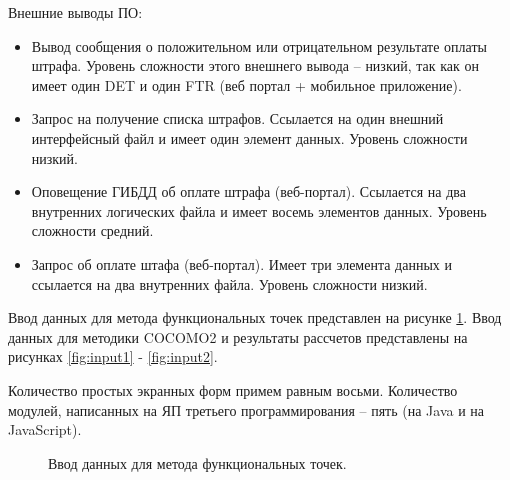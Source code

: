 \documentclass[a4paper,14pt]{article}
\begin{document}
Внешние выводы ПО:

\begin{itemize}
    \item Вывод сообщения о положительном или отрицательном результате оплаты штрафа. Уровень  сложности  этого внешнего вывода – низкий, так как он имеет один DET и один FTR (веб портал + мобильное приложение).
    \item Запрос на получение списка штрафов.  Ссылается на один внешний интерфейсный файл и имеет один элемент данных. Уровень сложности низкий.
    \item Оповещение ГИБДД об оплате штрафа (веб-портал). Ссылается на два внутренних логических файла и имеет восемь элементов данных. Уровень сложности средний.
    \item Запрос об оплате штафа (веб-портал). Имеет три элемента данных и ссылается на два внутренних файла. Уровень сложности низкий.
\end{itemize}

Ввод данных для метода функциональных точек представлен на рисунке \ref{fig:fp_set}. Ввод данных для методики COCOMO2 и результаты рассчетов представлены на рисунках \ref{fig:input1} - \ref{fig:input2}. 

Количество простых экранных форм примем равным восьми. Количество модулей, написанных на ЯП третьего программирования -- пять (на Java и на JavaScript).
\newpage
\begin{figure}[!h]
         \caption{Ввод данных для метода функциональных точек.}
    \label{fig:fp_set}
\end{figure}
\end{document}
